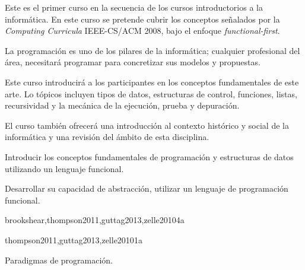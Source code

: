 \begin{syllabus}


\begin{justification}
Este es el primer curso en la secuencia de los cursos introductorios a la informática. En este curso se pretende cubrir los conceptos señalados por la \textit{Computing Curricula} IEEE-CS/ACM 2008, bajo el enfoque \textit{functional-first}.

La programación es uno de los pilares de la informática; cualquier profesional del área, necesitará programar para concretizar sus modelos y propuestas.

Este curso introducirá a los participantes en los conceptos fundamentales de este arte. Lo tópicos incluyen tipos de datos, estructuras de control, funciones, listas, recursividad y la mecánica de la ejecución, prueba y depuración.

El curso también ofrecerá una introducción al contexto histórico y social de la informática y una revisión del ámbito de esta disciplina.
\end{justification}

\begin{goals}
\item Introducir los conceptos fundamentales de programación y estructuras de datos utilizando un lenguaje funcional.
\item Desarrollar su capacidad de abstracción, utilizar un lenguaje de programación funcional.
\end{goals}

\begin{outcomes}
\end{outcomes}

\begin{unit}{\SPHistoryOfComputingDef}{brookshear,thompson2011,guttag2013,zelle2010}{4}{a}
    \SPHistoryOfComputingAllTopics
    \SPHistoryOfComputingAllObjectives
\end{unit}

\begin{unit}{\PLOverviewDef}{thompson2011,guttag2013,zelle2010}{1}{a}
   \begin{topics}
      \item \PLOverviewTopicHistory
      \item Paradigmas de programación.
   \end{topics}


\end{unit}
\end{syllabus}
